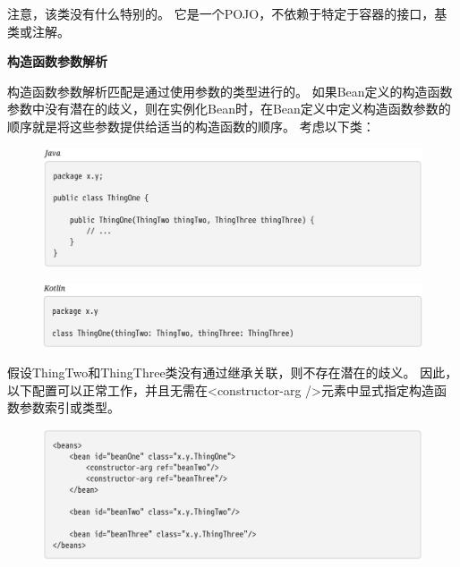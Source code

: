 \newpage
注意，该类没有什么特别的。 它是一个POJO，不依赖于特定于容器的接口，基类或注解。

\noindent \small{\textbf{构造函数参数解析}}
 
构造函数参数解析匹配是通过使用参数的类型进行的。 如果Bean定义的构造函数参数中没有潜在的歧义，则在实例化Bean时，在Bean定义中定义构造函数参数的顺序就是将这些参数提供给适当的构造函数的顺序。 考虑以下类：

\begin{figure}[ht]
    \centering
    \includegraphics[width=1\linewidth]{./Figure/IMG_code_22.png}
\end{figure}
\begin{figure}[ht]
    \centering
    \includegraphics[width=1\linewidth]{./Figure/IMG_code_23.png}
\end{figure}

假设ThingTwo和ThingThree类没有通过继承关联，则不存在潜在的歧义。 因此，以下配置可以正常工作，并且无需在<constructor-arg />元素中显式指定构造函数参数索引或类型。

\begin{figure}[ht]
    \centering
    \includegraphics[width=1\linewidth]{./Figure/IMG_code_24.png}
\end{figure}

